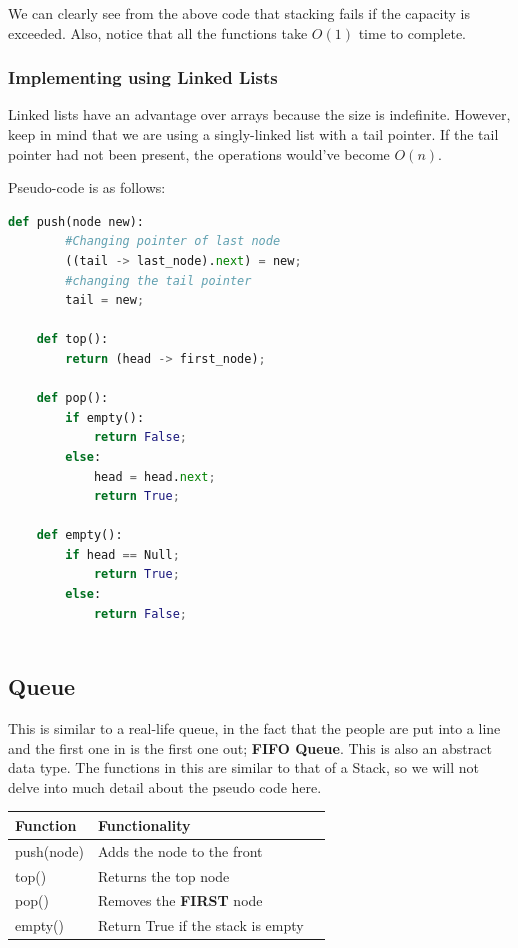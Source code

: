 \documentclass{article}
\theoremstyle{definition}
\theoremstyle{example}
\begin{document}
\vspace{3mm}
We can clearly see from the above code that stacking fails if the capacity is exceeded. Also, notice that all the functions take $O(1)$ time to complete.

\subsubsection{\Large Implementing using Linked Lists}
\hspace{4mm} Linked lists have an advantage over arrays because the size is indefinite. However, keep in mind that we are using a singly-linked list with a tail pointer. If the tail pointer had not been present, the operations would've become $O(n)$.\par
\vspace{4mm}
Pseudo-code is as follows:

\begin{lstlisting}[language = python, basicstyle = \Large]
    def push(node new):
        #Changing pointer of last node
        ((tail -> last_node).next) = new;
        #changing the tail pointer
        tail = new;
    
    def top():
        return (head -> first_node);
    
    def pop():
        if empty():
            return False;
        else:
            head = head.next;
            return True;
    
    def empty():
        if head == Null;
            return True;
        else:
            return False;
    
\end{lstlisting}

\subsection{\Large Queue}
\hspace{4mm} This is similar to a real-life queue, in the fact that the people are put into a line and the first one in is the first one out; \textbf{FIFO Queue}. This is also an abstract data type. The functions in this are similar to that of a Stack, so we will not delve into much detail about the pseudo code here.\par

\begin{center}
 \begin{tabular}{| m{9em} | m{15em} | m{4.5em} |} 
 \hline
 \textbf{Function} & \textbf{Functionality} \\ [0.5ex] 
 \hline
 push(node) & Adds the node to the front \\ 
 \hline
 top() & Returns the top node\\
 \hline
 pop() & Removes the \textbf{FIRST} node\\
 \hline
 empty() & Return True if the stack is empty\\
 \hline
 \end{tabular}
\end{center}
\end{document}
